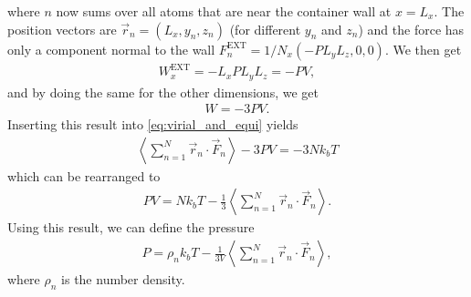 where $n$ now sums over all atoms that are near the container wall at $x=L_x$. The position vectors are $\vec r_n = (L_x, y_n, z_n)$ (for different $y_n$ and $z_n$) and the force has only a component normal to the wall $F_n^\text{EXT} = 1/N_x(-PL_yL_z, 0, 0)$. We then get
\begin{align}
    W^\text{EXT}_x = -L_xPL_yL_z = -PV,
\end{align}
and by doing the same for the other dimensions, we get
\begin{align}
    W = -3PV.
\end{align}
Inserting this result into \eqref{eq:virial_and_equi} yields
\begin{align}
    \left\langle \sum_{n=1}^N \vec r_n \cdot \vec F_n\right\rangle - 3PV = -3Nk_bT
\end{align}
which can be rearranged to
\begin{align}
    PV = Nk_bT - \frac{1}{3}\left\langle \sum_{n=1}^N \vec r_n \cdot \vec F_n\right\rangle.
\end{align}
Using this result, we can define the pressure
\begin{align}
    \label{eq:pressure_in_md}
	P = \rho_n k_bT - \frac{1}{3V}\left\langle \sum_{n=1}^N \vec r_n \cdot \vec F_n\right\rangle,
\end{align}
where $\rho_n$ is the number density.